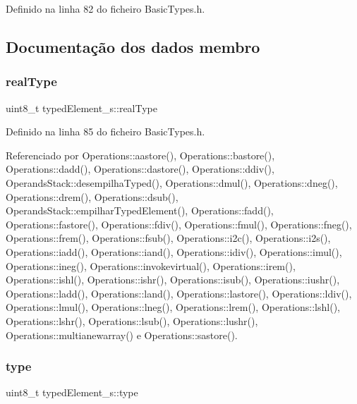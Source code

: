Definido na linha 82 do ficheiro Basic\+Types.\+h.



\subsection{Documentação dos dados membro}
\mbox{\label{structtypedElement__s_a265d7ad822f91bfa8fd6eb292e2d20d8}} 
\subsubsection{\texorpdfstring{real\+Type}{realType}}
{\footnotesize\ttfamily uint8\+\_\+t typed\+Element\+\_\+s\+::real\+Type}



Definido na linha 85 do ficheiro Basic\+Types.\+h.



Referenciado por Operations\+::aastore(), Operations\+::bastore(), Operations\+::dadd(), Operations\+::dastore(), Operations\+::ddiv(), Operands\+Stack\+::desempilha\+Typed(), Operations\+::dmul(), Operations\+::dneg(), Operations\+::drem(), Operations\+::dsub(), Operands\+Stack\+::empilhar\+Typed\+Element(), Operations\+::fadd(), Operations\+::fastore(), Operations\+::fdiv(), Operations\+::fmul(), Operations\+::fneg(), Operations\+::frem(), Operations\+::fsub(), Operations\+::i2c(), Operations\+::i2s(), Operations\+::iadd(), Operations\+::iand(), Operations\+::idiv(), Operations\+::imul(), Operations\+::ineg(), Operations\+::invokevirtual(), Operations\+::irem(), Operations\+::ishl(), Operations\+::ishr(), Operations\+::isub(), Operations\+::iushr(), Operations\+::ladd(), Operations\+::land(), Operations\+::lastore(), Operations\+::ldiv(), Operations\+::lmul(), Operations\+::lneg(), Operations\+::lrem(), Operations\+::lshl(), Operations\+::lshr(), Operations\+::lsub(), Operations\+::lushr(), Operations\+::multianewarray() e Operations\+::sastore().

\mbox{\label{structtypedElement__s_a725ddec1b2a04b6488cdde81f3e0255e}} 
\subsubsection{\texorpdfstring{type}{type}}
{\footnotesize\ttfamily uint8\+\_\+t typed\+Element\+\_\+s\+::type}



